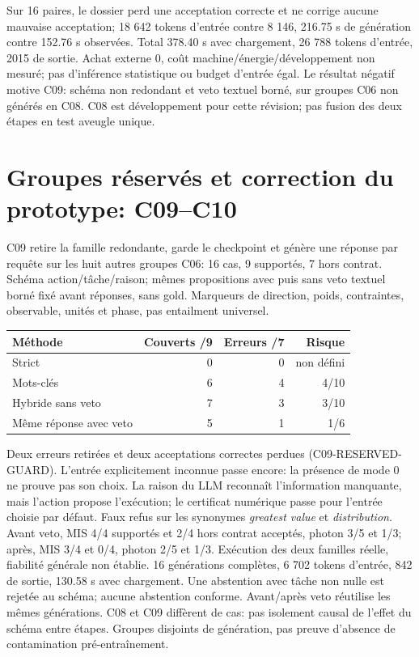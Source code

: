 \documentclass{article}
\begin{document}
Sur 16 paires, le dossier perd une acceptation correcte et ne corrige aucune
mauvaise acceptation; 18 642 tokens d'entrée contre 8 146, 216.75 s de génération
contre 152.76 s observées. Total 378.40 s avec chargement, 26 788 tokens d'entrée,
2015 de sortie. Achat externe 0, coût machine/énergie/développement non mesuré;
pas d'inférence statistique ou budget d'entrée égal.
Le résultat négatif motive C09: schéma non redondant et veto textuel borné,
sur groupes C06 non générés en C08. C08 est développement pour cette révision;
pas fusion des deux étapes en test aveugle unique.

\section{Groupes réservés et correction du prototype: C09--C10}
C09 retire la famille redondante, garde le checkpoint et génère une réponse
par requête sur les huit autres groupes C06: 16 cas, 9 supportés, 7 hors contrat.
Schéma action/tâche/raison; mêmes propositions avec puis sans veto textuel
borné fixé avant réponses, sans gold. Marqueurs de direction, poids,
contraintes, observable, unités et phase, pas entailment universel.
\begin{center}
\begin{tabular}{lrrr}
Méthode & Couverts /9 & Erreurs /7 & Risque\\ \hline
Strict &0&0&non défini\\
Mots-clés &6&4&4/10\\
Hybride sans veto &7&3&3/10\\
Même réponse avec veto &5&1&1/6\\ \hline
\end{tabular}
\end{center}
Deux erreurs retirées et deux acceptations correctes perdues
(C09-RESERVED-GUARD). L'entrée explicitement inconnue passe encore:
la présence de mode 0 ne prouve pas son choix. La raison du LLM reconnaît
l'information manquante, mais l'action propose l'exécution; le certificat
numérique passe pour l'entrée choisie par défaut. Faux refus sur les synonymes
\emph{greatest value} et \emph{distribution}.
Avant veto, MIS 4/4 supportés et 2/4 hors contrat acceptés, photon 3/5 et 1/3;
après, MIS 3/4 et 0/4, photon 2/5 et 1/3. Exécution des deux familles réelle,
fiabilité générale non établie.
16 générations complètes, 6 702 tokens d'entrée, 842 de sortie, 130.58 s avec
chargement. Une abstention avec tâche non nulle est rejetée au schéma;
aucune abstention conforme. Avant/après veto réutilise les mêmes générations.
C08 et C09 diffèrent de cas: pas isolement causal de l'effet du schéma entre
étapes. Groupes disjoints de génération, pas preuve d'absence de contamination
pré-entraînement.
\end{document}
